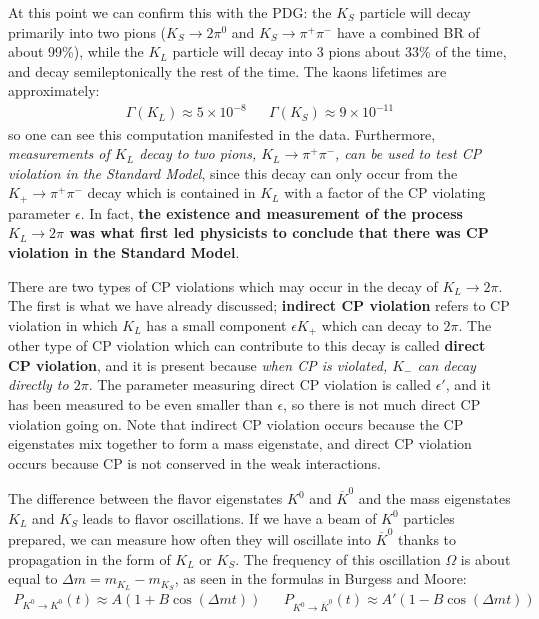 \documentclass[11pt, oneside]{article}   	%
\theoremstyle{definition}
\numberwithin{equation}{subsection}		%
\begin{document}
At this point we can confirm this with the PDG: the $K_S$ particle will decay primarily into two pions ($K_S\rightarrow 2\pi^0$ and $K_S\rightarrow 
\pi^+\pi^-$ have a combined BR of about 99\%), while the $K_L$ particle will decay into 3 pions about 33\% of the time, and decay semileptonically 
the rest of the time. The kaons lifetimes are approximately:
\begin{align}
	\Gamma(K_L)\approx 5\times 10^{-8} && \Gamma(K_S)\approx 9\times 10^{-11}
\end{align}
so one can see this computation manifested in the data. Furthermore, \textit{measurements of $K_L$ decay to two pions, 
$K_L\rightarrow\pi^+\pi^-$, can be used to test CP violation in the Standard Model}, since this decay can only occur from 
the $K_+\rightarrow\pi^+\pi^-$ decay which is contained in $K_L$ with a factor of the CP violating parameter $\epsilon$. 
In fact, \textbf{the existence and measurement of the process $K_L\rightarrow 2\pi$ was what first led physicists to conclude that 
there was CP violation in the Standard Model}. 

There are two types of CP violations which may occur in the decay of $K_L\rightarrow 2\pi$. The first is what we have already discussed; 
\textbf{indirect CP violation} refers to CP violation in which $K_L$ has a small component $\epsilon K_+$ which can decay to $2\pi$. The 
other type of CP violation which can contribute to this decay is called \textbf{direct CP violation}, and it is present because \textit{when CP is violated, 
$K_-$ can decay directly to $2\pi$}. The parameter measuring direct CP violation is called $\epsilon'$, and it has been measured to be 
even smaller than $\epsilon$, so there is not much direct CP violation going on. Note that indirect CP violation occurs because the CP eigenstates 
mix together to form a mass eigenstate, and direct CP violation occurs because CP is not conserved in the weak interactions. 

The difference between the flavor eigenstates $K^0$ and $\overline K^0$ and the mass eigenstates $K_L$ and $K_S$ leads to flavor oscillations. 
If we have a beam of $K^0$ particles prepared, we can measure how often they will oscillate into $\overline K^0$ thanks to propagation in the 
form of $K_L$ or $K_S$. The frequency of this oscillation $\Omega$ is about equal to $\Delta m = m_{K_L} - m_{K_S}$, as seen in the 
formulas in Burgess and Moore:
\begin{align}
	P_{K^0\rightarrow K^0}(t)\approx A(1 + B \cos(\Delta m t)) && P_{K^0\rightarrow \overline K^0}(t)\approx A'(1 - B \cos(\Delta m t))
\end{align}
\end{document}
